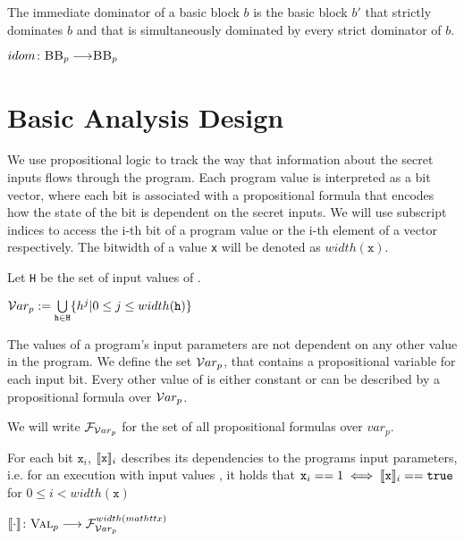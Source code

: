 \begin{definition} The immediate dominator of a basic block $b$ is the basic block $b'$ that strictly dominates $b$ and that is simultaneously dominated by every strict dominator of $b$.
    \begin{center}
        $idom\colon \mbb_p \longrightarrow \mbb_p$
    \end{center}
\end{definition}

\section{Basic Analysis Design}

We use propositional logic to track the way that information about the secret inputs flows through the program. Each program value is interpreted as a bit vector, where each bit is associated with a propositional formula that encodes how the state of the bit is dependent on the secret inputs. We will use subscript indices to access the i-th bit of a program value or the i-th element of a vector respectively. The bitwidth of a value \texttt{x} will be denoted as $width(\mathtt{x})$.

\begin{definition}
    Let \texttt{H} be the set of input values of \pp.
    \begin{center}
        $\mathcal{V}ar_p := \bigcup\limits_{\mathtt{h} \in \mathtt{H}} \{h^j | 0 \leq j \leq width(\mathtt{h})\}$
    \end{center}
    The values of a program's input parameters are not dependent on any other value in the program. We define the set $\mathcal{V}ar_p$, that contains a propositional variable for each input bit. Every other value of \p is either constant or can be described by a propositional formula over $\mathcal{V}ar_p$.
\end{definition}

We will write $\mathcal{F}_{\mathcal{V}ar_p}$ for the set of all propositional formulas over $var_p$.

\begin{definition}
    For each bit $\mathtt{x}_i$, $\llbracket\mathtt{x}\rrbracket_i$ describes its dependencies to the programs input parameters, i.e. for an execution with input values \In, it holds that $\mathtt{x}_i == 1 \iff \llbracket\mathtt{x}\rrbracket_i == \mathtt{true}$ for $0 \leq i < width(\mathtt{x})$
    \begin{center}
        $\llbracket \cdot \rrbracket\colon \textsc{Val}_p \longrightarrow \mathcal{F}_{\mathcal{V}ar_p}^{width(mathtt{x})}$
    \end{center}
\end{definition}

